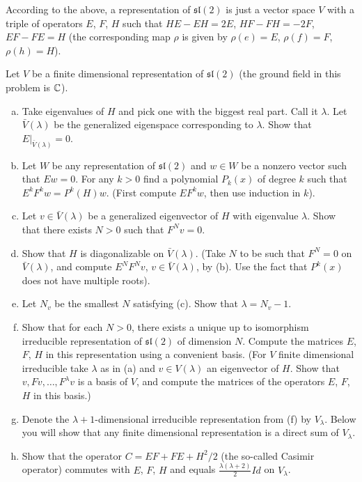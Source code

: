\documentclass[twoside]{article}
\begin{document}
\begin{ejercicio}{1.55}
According to the above, a representation of $\mathfrak{sl}(2)$ is just a vector space $V$ with a
triple of operators $E$, $F$, $H$ such that $HE − EH = 2E$, $HF − FH = −2F$, $EF − FE = H$ (the
corresponding map $ρ$ is given by $ρ(e) = E$, $ρ(f) = F$, $ρ(h) = H$).

Let $V$ be a finite dimensional representation of $\mathfrak{sl}(2)$ (the ground field in this problem is $\mathbb{C}$).

\begin{enumerate}[(a)]
\item Take eigenvalues of $H$ and pick one with the biggest real part. Call it $λ$. Let $\bar{V} (λ)$ be the
generalized eigenspace corresponding to $λ$. Show that $E|_{\bar{V} (λ)} = 0$.
\item Let $W$ be any representation of $\mathfrak{sl}(2)$ and $w ∈ W$ be a nonzero vector such that $Ew = 0$.
For any $k > 0$ find a polynomial $P_k(x)$ of degree $k$ such that $E^kF^kw = P^k(H)w$. (First compute
$EF^kw$, then use induction in $k$).
\item Let $v ∈  \bar{V} (λ)$ be a generalized eigenvector of $H$ with eigenvalue $λ$. Show that there exists
$N > 0$ such that $F^Nv = 0$.
\item Show that $H$ is diagonalizable on $ \bar{V} (λ)$. (Take $N$ to be such that $F^N = 0$ on $\bar{V} (λ)$, and
compute $E^NF^Nv$, $v ∈ \bar{ V} (λ)$, by (b). Use the fact that $P^k(x)$ does not have multiple roots).
\item Let $N_v$ be the smallest $N$ satisfying (c). Show that $λ = N_v − 1$.
\item Show that for each $N > 0$, there exists a unique up to isomorphism irreducible representation
of $\mathfrak{sl}(2)$ of dimension $N$. Compute the matrices $E$, $F$, $H$ in this representation using a convenient
basis. (For $V$ finite dimensional irreducible take $λ$ as in (a) and $v ∈ V (λ)$ an eigenvector of $H$.
Show that $v, Fv, \dots, F^λv$ is a basis of $V$, and compute the matrices of the operators $E$, $F$, $H$ in this
basis.)

\item[] Denote the $λ + 1$-dimensional irreducible representation from (f) by $V_λ$. Below you will show
that any finite dimensional representation is a direct sum of $V_λ$.
\item Show that the operator $C = EF + FE + H^2/2$ (the so-called Casimir operator) commutes
with $E$, $F$, $H$ and equals $\frac{λ(λ+2)}{2} Id$ on $V_λ$.


\end{enumerate}
\end{ejercicio}
\end{document}
